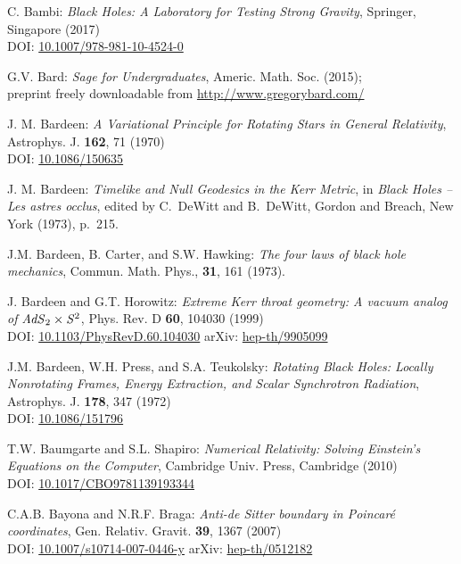 \begin{thebibliography}{123}
C. Bambi: {\em Black Holes: A Laboratory for Testing Strong Gravity},
Springer, Singapore (2017)\\
DOI: \href{https://doi.org/10.1007/978-981-10-4524-0}{10.1007/978-981-10-4524-0}

G.V. Bard: {\em Sage for Undergraduates}, Americ. Math. Soc. (2015); \\
preprint freely downloadable from \url{http://www.gregorybard.com/}

J. M. Bardeen: {\em A Variational Principle for Rotating Stars in General Relativity},
Astrophys. J. {\bf  162}, 71 (1970)\\
DOI: \href{https://doi.org/10.1086/150635}{10.1086/150635}

J. M. Bardeen: {\em Timelike and Null Geodesics in the Kerr Metric},
in {\em Black Holes -- Les astres occlus},  edited by C.~DeWitt and B.~DeWitt,
Gordon and Breach, New York (1973), p.~215.

J.M. Bardeen, B. Carter, and S.W. Hawking: {\em The four laws of black
hole mechanics}, Commun. Math. Phys., {\bf 31}, 161 (1973).

J. Bardeen and G.T. Horowitz:
{\em Extreme Kerr throat geometry: A vacuum analog of ${\it AdS}_2\times{\it S}^2$},
Phys. Rev. D {\bf 60}, 104030 (1999)\\
DOI: \href{https://doi.org/10.1103/PhysRevD.60.104030}{10.1103/PhysRevD.60.104030}\hfill
arXiv: \href{https://arxiv.org/abs/hep-th/9905099}{hep-th/9905099}

J.M. Bardeen, W.H. Press, and S.A. Teukolsky:
{\em Rotating Black Holes: Locally Nonrotating Frames, Energy Extraction, and Scalar Synchrotron Radiation},
Astrophys. J. {\bf  178}, 347 (1972)\\
DOI: \href{https://doi.org/10.1086/151796}{10.1086/151796}

T.W. Baumgarte and S.L. Shapiro:
{\em Numerical Relativity: Solving Einstein's Equations on the Computer},
Cambridge Univ. Press, Cambridge (2010)\\
DOI: \href{https://doi.org/10.1017/CBO9781139193344}{10.1017/CBO9781139193344}

C.A.B. Bayona and N.R.F. Braga:
{\em Anti-de Sitter boundary in Poincaré coordinates},
Gen. Relativ. Gravit. {\bf 39}, 1367 (2007)\\
DOI: \href{https://doi.org/10.1007/s10714-007-0446-y}{10.1007/s10714-007-0446-y}\hfill
arXiv: \href{https://arxiv.org/abs/hep-th/0512182}{hep-th/0512182}


\end{thebibliography}
